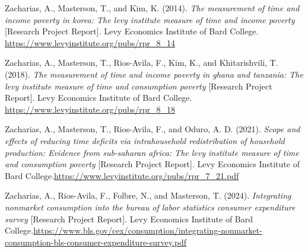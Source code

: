 \documentclass[
  11pt,
]{article}
\newlength{\cslhangindent}
\newenvironment{CSLReferences}[2] %
 {\begin{list}{}{%
  \setlength{\itemindent}{0pt}
  \setlength{\leftmargin}{0pt}
  \setlength{\parsep}{0pt}
  \ifodd #1
   \setlength{\leftmargin}{\cslhangindent}
   \setlength{\itemindent}{-1\cslhangindent}
  \fi
  \setlength{\itemsep}{#2\baselineskip}}}
 {\end{list}}
\begin{document}
\begin{CSLReferences}{1}{0}
Zacharias, A., Masterson, T., and Kim, K. (2014). \emph{The measurement
of time and income poverty in korea: The levy institute measure of time
and income poverty} {[}Research Project Report{]}. Levy Economics
Institute of Bard College.
\url{https://www.levyinstitute.org/pubs/rpr_8_14}

Zacharias, A., Masterson, T., Rios-Avila, F., Kim, K., and
Khitarishvili, T. (2018). \emph{The measurement of time and income
poverty in ghana and tanzania: The levy institute measure of time and
consumption poverty} {[}Research Project Report{]}. Levy Economics
Institute of Bard College.
\url{https://www.levyinstitute.org/pubs/rpr_8_18}

Zacharias, A., Masterson, T., Rios-Avila, F., and Oduro, A. D. (2021).
\emph{Scope and effects of reducing time deficits via intrahousehold
redistribution of household production: Evidence from sub-saharan
africa: The levy institute measure of time and consumption poverty}
{[}Research Project Report{]}. Levy Economics Institute of Bard
College.\href{\%20https://www.levyinstitute.org/pubs/rpr_7_21.pdf}{https://www.levyinstitute.org/pubs/rpr\_7\_21.pdf}

Zacharias, A., Rios-Avila, F., Folbre, N., and Masterson, T. (2024).
\emph{Integrating nonmarket consumption into the bureau of labor
statistics consumer expenditure survey} {[}Research Project Report{]}.
Levy Economics Institute of Bard
College.\href{\%20https://www.bls.gov/cex/consumption/integrating-nonmarket-consumption-bls-consumer-expenditure-survey.pdf}{https://www.bls.gov/cex/consumption/integrating-nonmarket-consumption-bls-consumer-expenditure-survey.pdf}

\end{CSLReferences}
\end{document}
